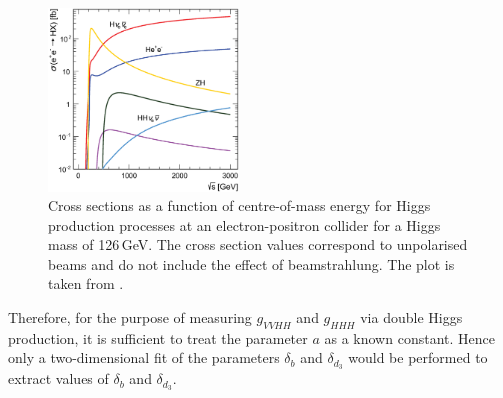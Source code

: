 \begin{figure}[!htbp]
\centering
\includegraphics[width=0.45\textwidth]{theory/HiggsCLICcrossSection}
\caption[]
{Cross sections as a function of centre-of-mass energy for Higgs production processes at an electron-positron collider for a Higgs mass of 126\,GeV. The cross section values correspond to unpolarised beams and do not include the effect of beamstrahlung. The plot is taken from \cite{Abramowicz:2016zbo}.}
\label{fig:theoryHiggsCrossSection}
\end{figure}


Therefore, for the purpose of measuring $g_{VVHH}$ and $g_{HHH}$ via double Higgs production, it is sufficient to treat the parameter $a$ as a known constant. Hence only a two-dimensional fit of the parameters $\delta_{b}$ and $\delta_{d_3}$ would be performed to extract values of $\delta_{b}$ and $\delta_{d_3}$.






